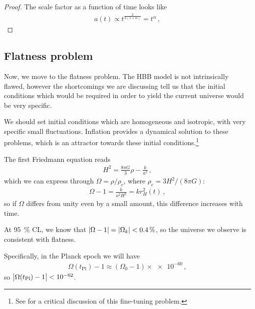 \documentclass[main.tex]{subfiles}
\begin{document}
\begin{proof}
The scale factor as a function of time looks like 
%
\begin{align}
a(t) \propto t^{ \frac{2}{3 (1 + w)}} = t^{\alpha }
\,,
\end{align}
%
\end{proof}


\subsection{Flatness problem}

Now, we move to the flatness problem. 
The HBB model is not intrinsically flawed, however the shortcomings we are discussing tell us that the initial conditions which would be required in order to yield the current universe would be very specific.

We should set initial conditions which are homogeneous and isotropic, with very specific small fluctuations. Inflation provides a dynamical solution to these problems, which is an attractor towards these initial conditions.\footnote{See \textcite[]{hossenfelderScreamsExplanationFinetuning2019} for a critical discussion of this fine-tuning problem.}

The first Friedmann equation reads 
%
\begin{align}
H^2=  \frac{8 \pi G}{3} \rho - \frac{k}{a^2}
\,,
\end{align}
%
which we can express through \(\Omega = \rho / \rho _c\), where \(\rho _c = 3 H^2 / (8 \pi G) \): 
%
\begin{align}
\Omega - 1 = \frac{k}{a^2 H^2} = k r_H^2 (t)
\,,
\end{align}
%
so if \(\Omega \) differs from unity even by a small amount, this difference increases with time. 

At \SI{95}{\percent} CL, we know that \(\abs{\Omega - 1} = \abs{\Omega _k} < \SI{.4}{\percent}\), so the universe we observe is consistent with flatness. 

Specifically, in the Planck epoch we will have 
%
\begin{align}
\Omega (t _{\text{Pl}}) - 1 \approx  (\Omega_0 - 1) \times \num{e-60}
\,,
\end{align}
%
so \(\abs{\Omega (t _{\text{Pl}}) - 1} < \num{e-62}\).
\end{document}
